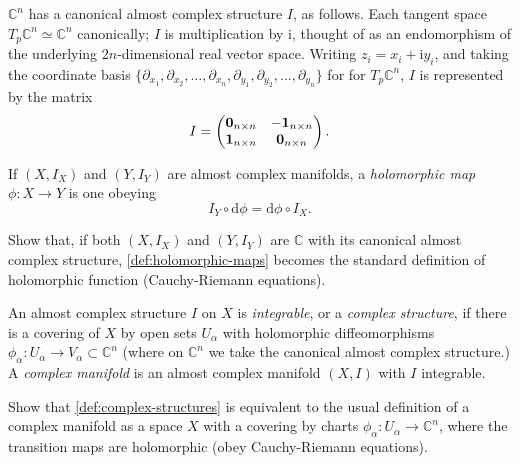 \documentclass[12pt,letterpaper,reqno]{amsart}
\numberwithin{equation}{section}
\newcommand{\C}{\ensuremath{\mathbb C}}
\newcommand{\I}{{\mathrm i}}
\newcommand{\de}{\mathrm{d}}
\newcommand{\ti}[1]{\textit{#1}}
\begin{document}
\begin{example} $\C^n$ has a canonical almost complex structure $I$, as follows. Each tangent space $T_p \C^n \simeq \C^n$ canonically; $I$ is multiplication by $\I$, thought of as an 
endomorphism of the underlying $2n$-dimensional real vector space.
Writing $z_i = x_i + \I y_i$, and taking the coordinate basis
$\{\partial_{x_1}, \partial_{x_2}, \dots, \partial_{x_n}, \partial_{y_1}, \partial_{y_2}, \dots, \partial_{y_n}\}$ for for $T_p \C^n$, $I$ is represented by the matrix
\begin{equation}
   I = \begin{pmatrix} {\bf 0}_{n \times n} & -{\bf 1}_{n \times n} \\ {\bf 1}_{n \times n} & {\bf 0}_{n \times n} \end{pmatrix}.
\end{equation}
\end{example}

\begin{defn} \label{def:holomorphic-maps} If $(X,I_X)$ and $(Y,I_Y)$ are almost
complex manifolds, a \ti{holomorphic map} $\phi: X \to Y$
is one obeying
\begin{equation}
 I_Y \circ \de \phi = \de \phi \circ I_X.  
\end{equation}
\end{defn}

\begin{exercise} Show that, if both $(X,I_X)$ and $(Y,I_Y)$ are $\C$ with its canonical 
almost complex structure, \autoref{def:holomorphic-maps} becomes the standard
definition of holomorphic function (Cauchy-Riemann equations).
\end{exercise}

\begin{defn} \label{def:complex-structures} An almost complex structure $I$ on $X$ is \ti{integrable}, 
or a \ti{complex structure}, if there is a covering of $X$ by open sets $U_\alpha$ with holomorphic diffeomorphisms $\phi_\alpha: U_\alpha \to V_\alpha \subset \C^n$ (where on $\C^n$ we take the
canonical almost complex structure.) A \ti{complex manifold} is an almost complex manifold $(X,I)$ with $I$ integrable.
\end{defn}

\begin{exercise} Show that \autoref{def:complex-structures} is equivalent to the usual definition of a complex manifold as a space
$X$ with a covering by charts $\phi_\alpha: U_\alpha \to \C^n$, where the transition maps are holomorphic (obey Cauchy-Riemann equations).
\end{exercise}
\end{document}
